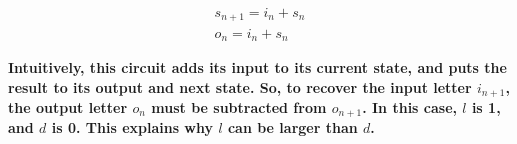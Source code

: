 \documentclass[journal]{IEEEtran}
\begin{document}
\begin{equation}
\begin{array}{c}
s_{n+1}=i_n+s_n\\
o_{n}=i_n+s_n
\end{array}
\end{equation}

\textbf{Intuitively,
this circuit adds its input to its current state,
and puts the result to its output and next state.
So,
to recover the input letter $i_{n+1}$,
the output letter $o_n$ must be subtracted from $o_{n+1}$.
In this case,
$l$ is 1,
and $d$ is 0.
This explains why $l$ can be larger than $d$.
}




%





%
%
\end{document}
